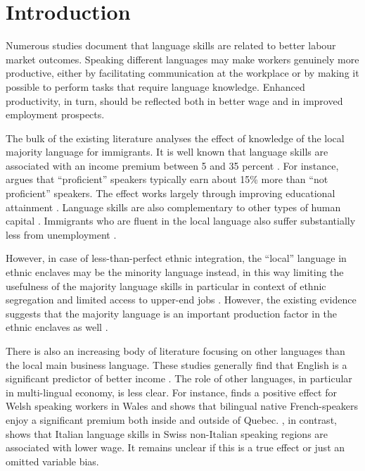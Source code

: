 \documentclass[12pt, a4paper]{article}
\begin{document}
\section{Introduction}
\label{sec:introduction}
Numerous studies document that language skills are related to better
labour market outcomes.
Speaking different languages may make workers genuinely more
productive, either by facilitating communication at the workplace
or by making it possible to perform
tasks that require language knowledge.
Enhanced productivity, in turn, should be reflected both in better wage
and in improved employment prospects.

The bulk of the existing literature analyses the effect of knowledge
of the local majority language for immigrants.  It is well known that
language skills are associated with an income premium
between 5 and 35 percent
\citep{Chiswick1995,bleakley+chin2004,shields+price2002,leslie+lindley2001,chiswick+miller2002,Chiswick2010,Chiswick2015, Dustmann2003}.  For
instance, \citet{chiswick2008} argues that ``proficient'' speakers
typically earn about 15\% more than ``not proficient'' speakers.
The effect works largely through improving educational attainment
\citep{bleakley+chin2004,rooth+saarela2007native}.  Language skills are
also complementary to other types of human capital
\citep{chiswick+miller2007}.
Immigrants who are fluent in the local language also suffer
substantially less from unemployment \citep{shields+price2002, Dustmann2003}.



However, in case of less-than-perfect ethnic integration, the ``local''
language in ethnic enclaves may be the minority language instead, in
this way limiting the usefulness of the majority language skills
\citep{chiswick+miller2002,hwang+2010} in particular in context of ethnic segregation and
limited access to upper-end jobs \citep{Toomet2011}.  However, the
existing evidence suggests that the majority language is
an important production factor in the ethnic enclaves as well
\citep{zhou+logan1989, clark+drinkwater2000}.


There is also an increasing body of literature focusing on other languages than the local main business language.  These studies generally find
that English is a significant predictor of better income
\citep{Lang2009, Casale2011, Toomet2011, Williams2011, azam+2013EDandCC, isphording2013, fabo+2017E}.
The role of other languages, in particular in multi-lingual economy, is
less clear.  For instance,
\cite{Drinkwater1997} finds
a positive effect for Welsh speaking workers in
Wales and \cite{Armstrong2015} shows that bilingual native French-speakers enjoy
a significant premium both inside and outside of Quebec.
\citet{FrancoisGrin1998}, in contrast,
shows that Italian language skills in Swiss non-Italian speaking
regions are associated with lower wage.  It remains unclear if
this is a true effect or just an omitted variable bias.
\end{document}
